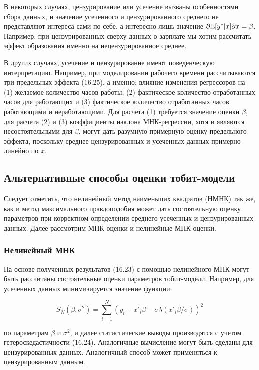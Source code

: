 В некоторых случаях, цензурирование или усечение вызваны особенностями сбора данных, и значение усеченного и цензурированного среднего не представляют интереса сами по себе, а интересно лишь значение $\partial \mathbb{E}[y^* |x ]\partial x=\beta$. Например, при цензурированных сверху данных о зарплате мы хотим рассчитать эффект образования именно на нецензурированное среднее.


В других случаях, усечение и цензурирование имеют поведенческую интерпретацию. Например, при моделировании рабочего времени рассчитываются три предельных эффекта (16.25), а именно: влияние изменения регрессоров на (1) желаемое количество часов работы, (2) фактическое количество отработанных часов для работающих и (3) фактическое количество отработанных часов работающими и неработающими. Для расчета (1) требуется значение оценки $\beta$, для расчета (2) и (3) коэффициенты наклона МНК-регрессии, хотя и являются несостоятельными для $\beta$, могут дать разумную примерную  оценку предельного эффекта, поскольку среднее цензурированных и усеченных данных примерно линейно по $x$.

\subsection{Альтернативные способы оценки тобит-модели}

Следует отметить, что нелинейный метод наименьших квадратов (НМНК) так же, как и метод максимального правдоподобия может дать состоятельную оценку параметров при корректном определении среднего усеченных и цензурированных данных. Далее рассмотрим МНК-оценки и нелинейные МНК-оценки.

\subsubsection*{Нелинейный МНК}

На основе полученных результатов (16.23) с помощью нелинейного МНК могут быть рассчитаны состоятельные оценки параметров тобит-модели. Например, для усеченных данных минимизируется значение функции

\[
S_{N}(\beta,\sigma^2)=\sum^N_{i=1}\left(y_{i}-{x'}_{i}{\beta}-{\sigma}{\lambda}({x'}_{i}{\beta}/{\sigma})\right)^2
\]

по параметрам $\beta$ и ${\sigma}^2$, и далее статистические выводы производятся с учетом  гетероскедастичности (16.24). Аналогичные вычисление могут быть сделаны для цензурированных данных. Аналогичный способ может применяться к цензурированным данным.

